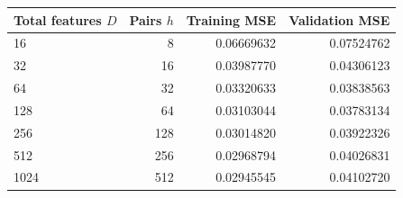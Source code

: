 \begin{center}\small
\begin{tabular}{lrrr}
\toprule
Total features $D$ & Pairs $h$ & Training MSE & Validation MSE \\
\midrule
16 & 8 & 0.06669632 & 0.07524762 \\
32 & 16 & 0.03987770 & 0.04306123 \\
64 & 32 & 0.03320633 & 0.03838563 \\
128 & 64 & 0.03103044 & 0.03783134 \\
256 & 128 & 0.03014820 & 0.03922326 \\
512 & 256 & 0.02968794 & 0.04026831 \\
1024 & 512 & 0.02945545 & 0.04102720 \\
\bottomrule
\end{tabular}\end{center}
